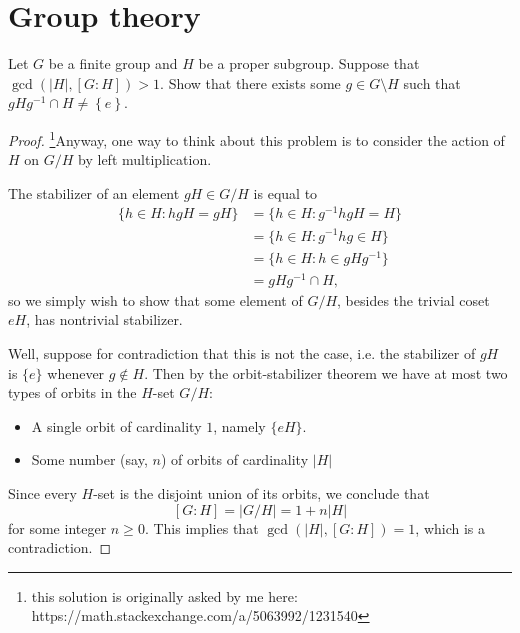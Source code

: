 \documentclass[11pt,letterpaper]{article}
\newcounter{problem}
\DeclareMathOperator{\1}{\mathbbm{1}}
\begin{document}
\section{Group theory}
\begin{exercise}
  Let $G$ be a finite group and $H$ be a proper subgroup. Suppose that $\gcd(|H|,[G:H])>1$. Show that there exists some $g \in G \setminus H$ such that $gHg^{-1} \cap H \ne \left\lbrace e\right\rbrace$. \end{exercise}
\begin{proof}
  \footnote{this solution is originally asked by me here: https://math.stackexchange.com/a/5063992/1231540}Anyway, one way to think about this problem is to consider the action of $H$ on $G/H$ by left multiplication.

The stabilizer of an element $gH \in G/H$ is equal to
\begin{align*}
\{h \in H : hgH = gH \} &= \{h \in H : g^{-1}hgH = H\} \\
&= \{h \in H : g^{-1}hg \in H \} \\
&= \{h \in H : h \in gHg^{-1}\} \\
&= gHg^{-1} \cap H,
\end{align*}
so we simply wish to show that some element of $G/H$, besides the trivial coset $eH$, has nontrivial stabilizer.

Well, suppose for contradiction that this is not the case, i.e. the stabilizer of $gH$ is $\{e\}$ whenever $g \notin H$. Then by the orbit-stabilizer theorem we have at most two types of orbits in the $H$-set $G/H$:
\begin{itemize}
  \item A single orbit of cardinality $1$, namely $\{eH\}$.
  \item Some number (say, $n$) of orbits of cardinality $\lvert H \rvert$
\end{itemize}

Since every $H$-set is the disjoint union of its orbits, we conclude that
$$[G : H] = \lvert G / H \rvert = 1 + n \lvert H \rvert$$
for some integer $n \geq 0$. This implies that $\gcd(\lvert H \rvert, [G:H]) = 1$, which is a contradiction.
\end{proof}
\end{document}
